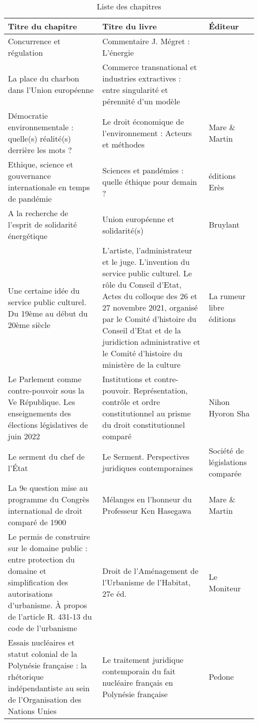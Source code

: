 \begin{longtable}{p{.4\linewidth}p{.35\linewidth}p{.15\linewidth}}
\caption{Liste des chapitres}
\label{tab_chapters}\\
\toprule
Titre du chapitre & Titre du livre & Éditeur \\
\midrule
Concurrence et régulation & Commentaire J. Mégret : L’énergie &  \\
La place du charbon dans l’Union européenne & Commerce transnational et industries extractives : entre singularité et pérennité d’un modèle &  \\
Démocratie environnementale : quelle(s) réalité(s) derrière les mots ? & Le droit économique de l’environnement : Acteurs et méthodes & Mare \& Martin \\
Ethique, science et gouvernance internationale en temps de pandémie & Sciences et pandémies : quelle éthique pour demain ? & éditions Erès \\
A la recherche de l’esprit de solidarité énergétique & Union européenne et solidarité(s) & Bruylant \\
Une certaine idée du service public culturel. Du 19ème au début du 20ème siècle & L’artiste, l’administrateur et le juge. L’invention du service public culturel. Le rôle du Conseil d’Etat, Actes du colloque des 26 et 27 novembre 2021, organisé par le Comité d’histoire du Conseil d’Etat et de la juridiction administrative et le Comité d’histoire du ministère de la culture & La rumeur libre éditions \\
Le Parlement comme contre-pouvoir sous la Ve République. Les enseignements des élections législatives de juin 2022 & Institutions et contre-pouvoir. Représentation, contrôle et ordre constitutionnel au prisme du droit constitutionnel comparé & Nihon Hyoron Sha \\
Le serment du chef de l’État & Le Serment. Perspectives juridiques contemporaines & Société de législations comparée \\
La 9e question mise au programme du Congrès international de droit comparé de 1900 & Mélanges en l’honneur du Professeur Ken Hasegawa & Mare \& Martin \\
Le permis de construire sur le domaine public : entre protection du domaine et simplification des autorisations d’urbanisme. À propos de l’article R. 431-13 du code de l’urbanisme & Droit de l’Aménagement de l’Urbanisme de l’Habitat, 27e éd. & Le Moniteur \\
Essais nucléaires et statut colonial de la Polynésie française : la rhétorique indépendantiste au sein de l’Organisation des Nations Unies & Le traitement juridique contemporain du fait nucléaire français en Polynésie française & Pedone \\

\end{longtable}
